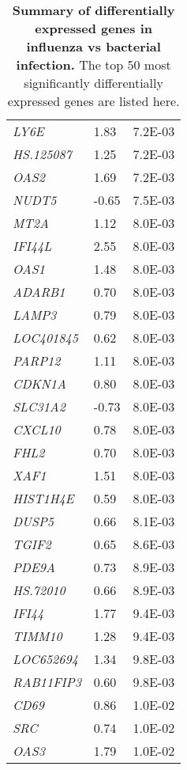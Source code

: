 \begin{table}[]
\begin{center}
{\begin{tabular}{lll}
\textit{LY6E}      & 1.83                       & 7.2E-03      \\
\textit{HS.125087} & 1.25                       & 7.2E-03      \\
\textit{OAS2}      & 1.69                       & 7.2E-03      \\
\textit{NUDT5}     & -0.65                      & 7.5E-03      \\
\textit{MT2A}      & 1.12                       & 8.0E-03      \\
\textit{IFI44L}    & 2.55                       & 8.0E-03      \\
\textit{OAS1}      & 1.48                       & 8.0E-03      \\
\textit{ADARB1}    & 0.70                       & 8.0E-03      \\
\textit{LAMP3}     & 0.79                       & 8.0E-03      \\
\textit{LOC401845} & 0.62                       & 8.0E-03      \\
\textit{PARP12}    & 1.11                       & 8.0E-03      \\
\textit{CDKN1A}    & 0.80                       & 8.0E-03      \\
\textit{SLC31A2}   & -0.73                      & 8.0E-03      \\
\textit{CXCL10}    & 0.78                       & 8.0E-03      \\
\textit{FHL2}      & 0.70                       & 8.0E-03      \\
\textit{XAF1}      & 1.51                       & 8.0E-03      \\
\textit{HIST1H4E}  & 0.59                       & 8.0E-03      \\
\textit{DUSP5}     & 0.66                       & 8.1E-03      \\
\textit{TGIF2}     & 0.65                       & 8.6E-03      \\
\textit{PDE9A}     & 0.73                       & 8.9E-03      \\
\textit{HS.72010}  & 0.66                       & 8.9E-03      \\
\textit{IFI44}     & 1.77                       & 9.4E-03      \\
\textit{TIMM10}    & 1.28                       & 9.4E-03      \\
\textit{LOC652694} & 1.34                       & 9.8E-03      \\
\textit{RAB11FIP3} & 0.60                       & 9.8E-03      \\
\textit{CD69}      & 0.86                       & 1.0E-02      \\
\textit{SRC}       & 0.74                       & 1.0E-02      \\
\textit{OAS3}      & 1.79                       & 1.0E-02     
\end{tabular}}
\end{center}
\caption[Differentially expressed genes in influenza infection]{\textbf{Summary of differentially expressed genes in influenza vs bacterial infection.} The top 50 most significantly differentially expressed genes are listed here.}
\label{tab:flu-de-genes}
\end{table}